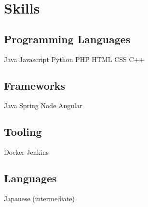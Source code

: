 \documentclass[]{deedy-resume-openfont}
\begin{document}
\begin{minipage}[t]{0.33\textwidth}

\section{Skills}
\subsection{Programming Languages}
Java \textbullet{} Javascript \textbullet{} \textbullet{} Python \textbullet{} PHP \textbullet{} HTML \textbullet{} CSS \textbullet{} C++ \\
\sectionsep

\subsection{Frameworks}
Java Spring \textbullet{} Node \textbullet{} Angular \\
\sectionsep

\subsection{Tooling}
Docker \textbullet{} Jenkins \\
\sectionsep

\subsection{Languages}
Japanese (intermediate)
\sectionsep

%
%

\end{minipage} 
\hfill
\end{document}
